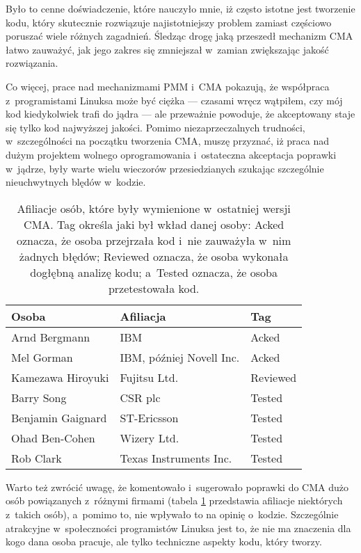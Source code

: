 Było to cenne doświadczenie, które nauczyło mnie, iż często istotne
jest tworzenie kodu, który skutecznie rozwiązuje najistotniejszy
problem zamiast częściowo poruszać wiele różnych zagadnień.  Śledząc
drogę jaką przeszedł mechanizm CMA łatwo zauważyć, jak jego zakres się
zmniejszał w~zamian zwiększając jakość rozwiązania.

Co więcej, prace nad mechanizmami PMM i~CMA pokazują, że współpraca
z~programistami Linuksa może być ciężka --- czasami wręcz wątpiłem,
czy mój kod kiedykolwiek trafi do jądra --- ale przeważnie powoduje,
że akceptowany staje się tylko kod najwyższej jakości.  Pomimo
niezaprzeczalnych trudności, w~szczególności na początku tworzenia
CMA, muszę przyznać, iż praca nad dużym projektem wolnego
oprogramowania i~ostateczna akceptacja poprawki w~jądrze, były warte
wielu wieczorów przesiedzianych szukając szczególnie nieuchwytnych
blędów w~kodzie.

\begin{table}[htbp]
\begin{center}
\begin{tabular}{lll}
Osoba             & Afiliacja                & Tag \\
\hline
Arnd Bergmann     & IBM                      & Acked \\
Mel Gorman        & IBM, później Novell Inc. & Acked \\
Kamezawa Hiroyuki & Fujitsu Ltd.             & Reviewed \\
Barry Song        & CSR plc                  & Tested \\
Benjamin Gaignard & ST-Ericsson              & Tested \\
Ohad Ben-Cohen    & Wizery Ltd.              & Tested \\
Rob Clark         & Texas Instruments Inc.   & Tested \\
\end{tabular}
\end{center}
\caption{Afiliacje osób, które były wymienione w~ostatniej wersji CMA.
  Tag określa jaki był wkład danej osoby: Acked oznacza, że osoba
  przejrzała kod i~nie zauważyła w~nim żadnych błędów; Reviewed
  oznacza, że osoba wykonała dogłębną analizę kodu; a~Tested oznacza,
  że osoba przetestowała kod.}
\label{tab:cma-ppl}
\end{table}

Warto też zwrócić uwagę, że komentowało i~sugerowało poprawki do CMA
dużo osób powiązanych z~różnymi firmami (tabela \ref{tab:cma-ppl}
przedstawia afiliacje niektórych z~takich osób), a~pomimo to, nie
wpływało to na opinię o~kodzie.  Szczególnie atrakcyjne w~społeczności
programistów Linuksa jest to, że nie ma znaczenia dla kogo dana osoba
pracuje, ale tylko techniczne aspekty kodu, który tworzy.
